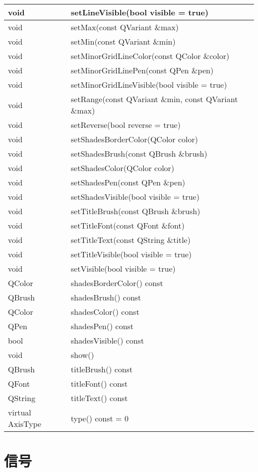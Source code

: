 \begin{longtable}{|l|l|}
\hline
void	&setLineVisible(bool visible = true)\\
\hline
void	&setMax(const QVariant \&max)\\
\hline
void	&setMin(const QVariant \&min)\\
\hline
void	&setMinorGridLineColor(const QColor \&color)\\
\hline
void	&setMinorGridLinePen(const QPen \&pen)\\
\hline
void	&setMinorGridLineVisible(bool visible = true)\\
\hline
void	&setRange(const QVariant \&min, const QVariant \&max)\\
\hline
void	&setReverse(bool reverse = true)\\
\hline
void	&setShadesBorderColor(QColor color)\\
\hline
void	&setShadesBrush(const QBrush \&brush)\\
\hline
void	&setShadesColor(QColor color)\\
\hline
void	&setShadesPen(const QPen \&pen)\\
\hline
void&	setShadesVisible(bool visible = true)\\
\hline
void&	setTitleBrush(const QBrush \&brush)\\
\hline
void&	setTitleFont(const QFont \&font)\\
\hline
void&	setTitleText(const QString \&title)\\
\hline
void&	setTitleVisible(bool visible = true)\\
\hline
void&	setVisible(bool visible = true)\\
\hline
QColor&	shadesBorderColor() const\\
\hline
QBrush&	shadesBrush() const\\
\hline
QColor&	shadesColor() const\\
\hline
QPen&	shadesPen() const\\
\hline
bool&	shadesVisible() const\\
\hline
void&	show()\\
\hline
QBrush&	titleBrush() const\\
\hline
QFont&	titleFont() const\\
\hline
QString&	titleText() const\\
\hline
virtual AxisType &type() const = 0\\
\hline
\end{longtable}

\section{信号}

